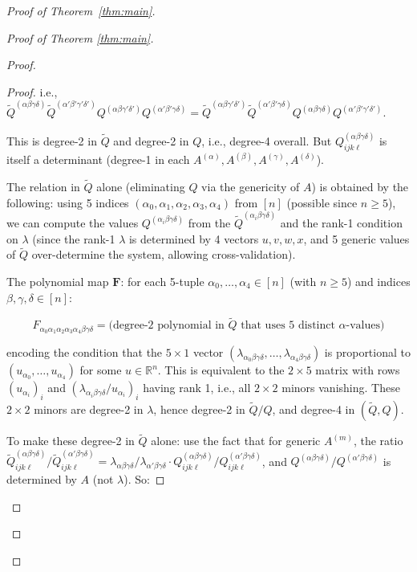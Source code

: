 \documentclass[12pt]{article}
\theoremstyle{definition}
\begin{document}
\begin{proof}[Proof of Theorem~\ref{thm:main}]
\begin{proof}[Proof of Theorem \ref{thm:main}]
\begin{proof}
\begin{proof}
i.e., $\tilde{Q}^{(\alpha\beta\gamma\delta)}\tilde{Q}^{(\alpha'\beta'\gamma'\delta')}Q^{(\alpha\beta\gamma'\delta')}Q^{(\alpha'\beta'\gamma\delta)} = \tilde{Q}^{(\alpha\beta\gamma'\delta')}\tilde{Q}^{(\alpha'\beta'\gamma\delta)}Q^{(\alpha\beta\gamma\delta)}Q^{(\alpha'\beta'\gamma'\delta')}$.

This is degree-2 in $\tilde{Q}$ and degree-2 in $Q$, i.e., degree-4 overall. But $Q^{(\alpha\beta\gamma\delta)}_{ijk\ell}$ is itself a determinant (degree-1 in each $A^{(\alpha)},A^{(\beta)},A^{(\gamma)},A^{(\delta)}$).

The relation in $\tilde{Q}$ alone (eliminating $Q$ via the genericity of $A$) is obtained by the following: using 5 indices $(\alpha_0,\alpha_1,\alpha_2,\alpha_3,\alpha_4)$ from $[n]$ (possible since $n\geq 5$), we can compute the values $Q^{(\alpha_i\beta\gamma\delta)}$ from the $\tilde{Q}^{(\alpha_i\beta\gamma\delta)}$ and the rank-1 condition on $\lambda$ (since the rank-1 $\lambda$ is determined by 4 vectors $u,v,w,x$, and 5 generic values of $\tilde{Q}$ over-determine the system, allowing cross-validation).

The polynomial map $\mathbf{F}$: for each 5-tuple $\alpha_0,\ldots,\alpha_4\in[n]$ (with $n\geq 5$) and indices $\beta,\gamma,\delta\in[n]$:

$$F_{\alpha_0\alpha_1\alpha_2\alpha_3\alpha_4\beta\gamma\delta} = \text{(degree-2 polynomial in }\tilde{Q}\text{ that uses 5 distinct }\alpha\text{-values)}$$

encoding the condition that the $5\times 1$ vector $(\lambda_{\alpha_0\beta\gamma\delta},\ldots,\lambda_{\alpha_4\beta\gamma\delta})$ is proportional to $(u_{\alpha_0},\ldots,u_{\alpha_4})$ for some $u\in\mathbb{R}^n$. This is equivalent to the $2\times 5$ matrix with rows $(u_{\alpha_i})_i$ and $(\lambda_{\alpha_i\beta\gamma\delta}/u_{\alpha_i})_i$ having rank 1, i.e., all $2\times 2$ minors vanishing. These $2\times 2$ minors are degree-2 in $\lambda$, hence degree-2 in $\tilde{Q}/Q$, and degree-4 in $(\tilde{Q}, Q)$.

To make these degree-2 in $\tilde{Q}$ alone: use the fact that for generic $A^{(m)}$, the ratio $\tilde{Q}^{(\alpha\beta\gamma\delta)}_{ijk\ell}/\tilde{Q}^{(\alpha'\beta\gamma\delta)}_{ijk\ell} = \lambda_{\alpha\beta\gamma\delta}/\lambda_{\alpha'\beta\gamma\delta}\cdot Q^{(\alpha\beta\gamma\delta)}_{ijk\ell}/Q^{(\alpha'\beta\gamma\delta)}_{ijk\ell}$, and $Q^{(\alpha\beta\gamma\delta)}/Q^{(\alpha'\beta\gamma\delta)}$ is determined by $A$ (not $\lambda$). So:


\end{proof}
\end{proof}
\end{proof}
\end{proof}
\end{document}
